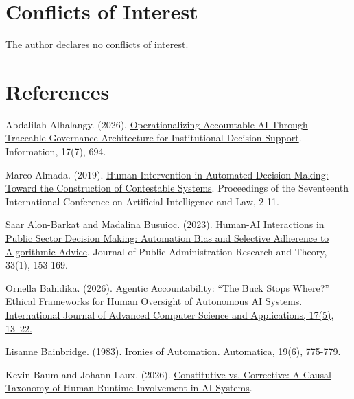 \documentclass[11pt]{article}
\newenvironment{TAEReferences}{%
  \begin{list}{}{%
    \renewcommand{\makelabel}[1]{}%
    \setlength{\labelwidth}{0pt}%
    \setlength{\labelsep}{0pt}%
    \setlength{\leftmargin}{0.5in}%
    \setlength{\itemindent}{-0.5in}%
    \setlength{\itemsep}{0.45em}%
    \setlength{\parsep}{0pt}%
    \setlength{\topsep}{0.25em}%
  }%
}{\end{list}}
\begin{document}
\section*{Conflicts of Interest}

The author declares no conflicts of interest.

\section*{References}

\begin{TAEReferences}
\item{}\label{reference-1} Abdalilah Alhalangy. (2026). \href{https://doi.org/10.3390/info17070694}{Operationalizing Accountable AI Through Traceable Governance Architecture for Institutional Decision Support}. Information, 17(7), 694.
\item{}\label{reference-2} Marco Almada. (2019). \href{https://doi.org/10.1145/3322640.3326699}{Human Intervention in Automated Decision-Making: Toward the Construction of Contestable Systems}. Proceedings of the Seventeenth International Conference on Artificial Intelligence and Law, 2-11.
\item{}\label{reference-3} Saar Alon-Barkat and Madalina Busuioc. (2023). \href{https://doi.org/10.1093/jopart/muac007}{Human-AI Interactions in Public Sector Decision Making: Automation Bias and Selective Adherence to Algorithmic Advice}. Journal of Public Administration Research and Theory, 33(1), 153-169.
\item{}\label{reference-4} \href{https://doi.org/10.14569/IJACSA.2026.0170502}{Ornella Bahidika. (2026). Agentic Accountability: “The Buck Stops Where?” Ethical Frameworks for Human Oversight of Autonomous AI Systems. International Journal of Advanced Computer Science and Applications, 17(5), 13--22.}
\item{}\label{reference-5} Lisanne Bainbridge. (1983). \href{https://doi.org/10.1016/0005-1098(83)90046-8}{Ironies of Automation}. Automatica, 19(6), 775-779.
\item{}\label{reference-6} Kevin Baum and Johann Laux. (2026). \href{https://doi.org/10.48550/arXiv.2603.19213}{Constitutive vs. Corrective: A Causal Taxonomy of Human Runtime Involvement in AI Systems}.

\end{TAEReferences}
\end{document}
